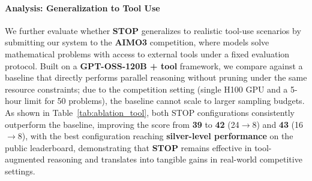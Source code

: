 \documentclass[11pt]{article}
\theoremstyle{plain}
\begin{document}
\paragraph{Analysis: Generalization to Tool Use}
We further evaluate whether \textbf{STOP} generalizes to realistic tool-use scenarios by submitting our system to the \textbf{AIMO3} competition, where models solve mathematical problems with access to external tools under a fixed evaluation protocol. Built on a \textbf{GPT-OSS-120B + tool} framework, we compare against a baseline that directly performs parallel reasoning without pruning under the same resource constraints; due to the competition setting (single H100 GPU and a 5-hour limit for 50 problems), the baseline cannot scale to larger sampling budgets. As shown in Table~\ref{tab:ablation_tool}, both STOP configurations consistently outperform the baseline, improving the score from \textbf{39} to \textbf{42} (24$\rightarrow$8) and \textbf{43} (16$\rightarrow$8), with the best configuration reaching \textbf{silver-level performance} on the public leaderboard, demonstrating that \textbf{STOP} remains effective in tool-augmented reasoning and translates into tangible gains in real-world competitive settings.


\end{document}
